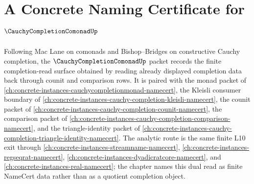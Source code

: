 \chapter{A Concrete Naming Certificate for $\CauchyCompletionComonadUp$}
\label{ch:concrete-instances-cauchy-completion-comonad-namecert}

Following Mac Lane on comonads and Bishop--Bridges on constructive Cauchy completion, the $\CauchyCompletionComonadUp$ packet records the finite completion-read surface obtained by reading already displayed completion data back through counit and comparison rows. It is paired with the monad packet of \autoref{ch:concrete-instances-cauchycompletionmonad-namecert}, the Kleisli consumer boundary of \autoref{ch:concrete-instances-cauchy-completion-kleisli-namecert}, the counit packet of \autoref{ch:concrete-instances-cauchy-completion-counit-namecert}, the comparison packet of \autoref{ch:concrete-instances-cauchy-completion-comparison-namecert}, and the triangle-identity packet of \autoref{ch:concrete-instances-cauchy-completion-triangle-identity-namecert}. The analytic route is the same finite L10 exit through \autoref{ch:concrete-instances-streamname-namecert}, \autoref{ch:concrete-instances-regseqrat-namecert}, \autoref{ch:concrete-instances-dyadicratcore-namecert}, and \autoref{ch:concrete-instances-real-namecert}; the chapter names this dual read as finite NameCert data rather than as a quotient completion object.


